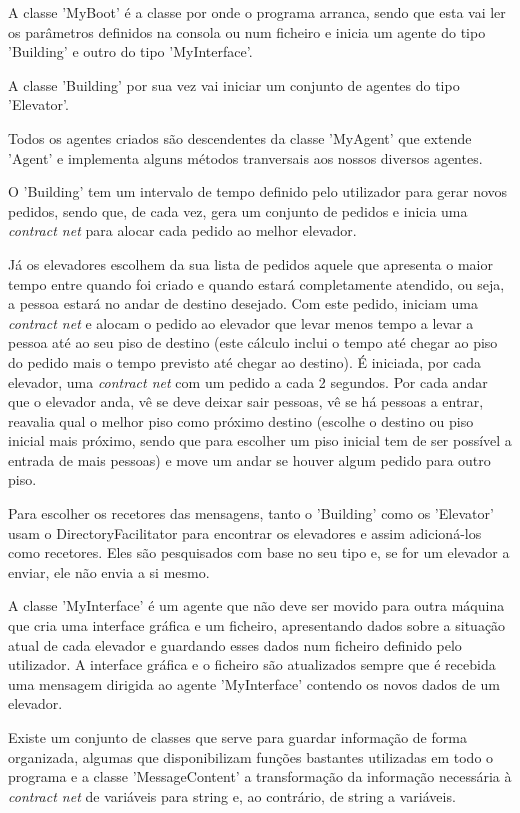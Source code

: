 ﻿\documentclass[a4paper]{article}
\begin{document}
A classe 'MyBoot' é a classe por onde o programa arranca, sendo que esta vai ler os parâmetros definidos na consola ou num ficheiro e inicia um agente do tipo 'Building' e outro do tipo 'MyInterface'.

A classe 'Building' por sua vez vai iniciar um conjunto de agentes do tipo 'Elevator'.

Todos os agentes criados são descendentes da classe 'MyAgent' que extende 'Agent' e implementa alguns métodos tranversais aos nossos diversos agentes.

O 'Building' tem um intervalo de tempo definido pelo utilizador para gerar novos pedidos, sendo que, de cada vez, gera um conjunto de pedidos e inicia uma \textit{contract net} para alocar cada pedido ao melhor elevador.

Já os elevadores escolhem da sua lista de pedidos aquele que apresenta o maior tempo entre quando foi criado e quando estará completamente atendido, ou seja, a pessoa estará no andar de destino desejado. Com este pedido, iniciam uma \textit{contract net} e alocam o pedido ao elevador que levar menos tempo a levar a pessoa até ao seu piso de destino (este cálculo inclui o tempo até chegar ao piso do pedido mais o tempo previsto até chegar ao destino). É iniciada, por cada elevador, uma \textit{contract net} com um pedido a cada 2 segundos. Por cada andar que o elevador anda, vê se deve deixar sair pessoas, vê se há pessoas a entrar, reavalia qual o melhor piso como próximo destino (escolhe o destino ou piso inicial mais próximo, sendo que para escolher um piso inicial tem de ser possível a entrada de mais pessoas) e move um andar se houver algum pedido para outro piso.

Para escolher os recetores das mensagens, tanto o 'Building' como os 'Elevator' usam o DirectoryFacilitator para encontrar os elevadores e assim adicioná-los como recetores. Eles são pesquisados com base no seu tipo e, se for um elevador a enviar, ele não envia a si mesmo.

A classe 'MyInterface' é um agente que não deve ser movido para outra máquina que cria uma interface gráfica e um ficheiro, apresentando dados sobre a situação atual de cada elevador e guardando esses dados num ficheiro definido pelo utilizador. A interface gráfica e o ficheiro são atualizados sempre que é recebida uma mensagem dirigida ao agente 'MyInterface' contendo os novos dados de um elevador.

Existe um conjunto de classes que serve para guardar informação de forma organizada, algumas que disponibilizam funções bastantes utilizadas em todo o programa e a classe 'MessageContent' a transformação da informação necessária à \textit{contract net} de variáveis para string e, ao contrário, de string a variáveis.
\end{document}
